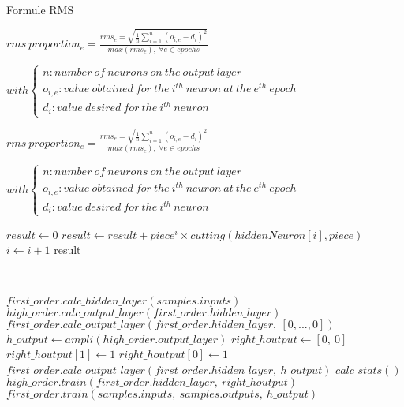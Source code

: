 \documentclass[a4paper,12pt]{article}
\begin{document}
Formule RMS

$ rms\ proportion_{e} = \frac{ rms_{e} = \sqrt{ \frac{1}{n} \sum \limits_{i=1}^{n} ( o_{i,e} - d_{i} )^2 }}{max(rms_{e}),\ \forall e \in epochs } $

$ with \left\lbrace \begin{array}{lll} n : number\ of\ neurons\ on\ the\ output\ layer\\o_{i,e} : value\ obtained\ for\ the\ i^{th}\ neuron\ at\ the\ e^{th}\ epoch\\d_{i} : value\ desired \ for\ the\ i^{th}\ neuron\end{array} \right.$
         
$ rms\ proportion_{e} = \frac{ rms_{e} = \sqrt{ \frac{1}{n} \sum \limits_{i=1}^{n} ( o_{i,e} - d_{i} )^2 }}{max(rms_{e}),\ \forall e \in epochs } $

$ with \left\lbrace \begin{array}{lll} n : number\ of\ neurons\ on\ the\ output\ layer\\o_{i,e} : value\ obtained\ for\ the\ i^{th}\ neuron\ at\ the\ e^{th}\ epoch\\d_{i} : value\ desired \ for\ the\ i^{th}\ neuron\end{array} \right.$
         


\newpage


\begin{algorithmic}

\State $result \gets 0$
\State $result \gets result + piece^{i} \times cutting(hiddenNeuron[i], piece) $
\State $i \gets i + 1$
\EndFor
\State \Return result
\EndFunction

\end{algorithmic}

 -\\[4cm]

\begin{algorithmic}

\State $first\_order.calc\_hidden\_layer(samples.inputs)$
\State $high\_order.calc\_output\_layer(first\_order.hidden\_layer)$
\State $first\_order.calc\_output\_layer(first\_order.hidden\_layer,\ [0, ..., 0])$
\State 
\State $h\_output \gets ampli(high\_order.output\_layer)$
\State $right\_houtput \gets [0,\ 0]$
  \State $right\_houtput[1] \gets 1$
\Else
  \State $right\_houtput[0] \gets 1$
\EndIf
\State $first\_order.calc\_output\_layer(first\_order.hidden\_layer,\ h\_output)$
\State
\State $calc\_stats()$
\State
\State $high\_order.train(first\_order.hidden\_layer,\ right\_houtput)$
\State $first\_order.train(samples.inputs,\ samples.outputs,\ h\_output)$


\end{algorithmic}
\end{document}
